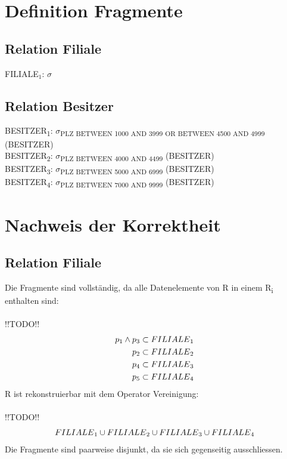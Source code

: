 \documentclass[11pt,a4paper,parskip=half]{scrartcl}
\begin{document}
\section{Definition Fragmente}
\subsection{Relation Filiale}

FILIALE$_1$: $\sigma$\textsubscript{}\\


\subsection{Relation Besitzer}

BESITZER\textsubscript{1}: $\sigma$\textsubscript{PLZ  BETWEEN 1000 AND 3999 OR BETWEEN 4500 AND 4999} (BESITZER)\\
BESITZER\textsubscript{2}: $\sigma$\textsubscript{PLZ  BETWEEN 4000 AND 4499} (BESITZER)\\
BESITZER\textsubscript{3}: $\sigma$\textsubscript{PLZ  BETWEEN 5000 AND 6999} (BESITZER)\\
BESITZER\textsubscript{4}: $\sigma$\textsubscript{PLZ  BETWEEN 7000 AND 9999} (BESITZER)\\


\section{Nachweis der Korrektheit}
\subsection{Relation Filiale}
Die Fragmente sind vollständig, da alle Datenelemente von R in einem R\textsubscript{i} enthalten sind:\\\\
!!TODO!!\\
\begin{align*}
p\textsubscript{1} \wedge p\textsubscript{3} \subset  FILIALE\textsubscript{1}\\
p\textsubscript{2} \subset  FILIALE\textsubscript{2}\\
p\textsubscript{4} \subset  FILIALE\textsubscript{3}\\
p\textsubscript{5} \subset  FILIALE\textsubscript{4}\\
\end{align*}
R ist rekonstruierbar mit dem Operator Vereinigung:\\\\
!!TODO!!\\
\begin{align*}
FILIALE\textsubscript{1} \cup FILIALE\textsubscript{2} \cup FILIALE\textsubscript{3} \cup FILIALE\textsubscript{4}\\
\end{align*}
Die Fragmente sind paarweise disjunkt, da sie sich gegenseitig ausschliessen.\\
\end{document}
